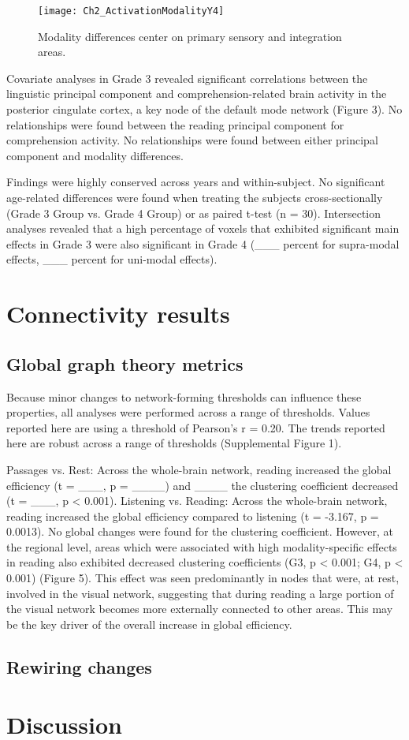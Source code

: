 \begin{figure}[!b]
\centering
\texttt{[image: Ch2\_ActivationModalityY4]}
    \caption[Modality differences center on primary sensory and integration areas.]{Modality differences center on primary sensory and integration areas.}
\label{fig:ch2_modality}
\end{figure}

Covariate analyses in Grade 3 revealed significant correlations between the linguistic principal component and comprehension-related brain activity in the posterior cingulate cortex, a key node of the default mode network (Figure 3). No relationships were found between the reading principal component for comprehension activity. No relationships were found between either principal component and modality differences.

Findings were highly conserved across years and within-subject. No significant age-related differences were found when treating the subjects cross-sectionally (Grade 3 Group vs. Grade 4 Group) or as paired t-test (n = 30). Intersection analyses revealed that a high percentage of voxels that exhibited significant main effects in Grade 3 were also significant in Grade 4 (___ percent for supra-modal effects, ___ percent for uni-modal effects).

\section{Connectivity results}


\subsection{Global graph theory metrics}
Because minor changes to network-forming thresholds can influence these properties, all analyses were performed across a range of thresholds. Values reported here are using a threshold of Pearson’s r = 0.20. The trends reported here are robust across a range of thresholds (Supplemental Figure 1). 

Passages vs. Rest: Across the whole-brain network, reading increased the global efficiency (t = ___, p = ____) and ____ the clustering coefficient decreased (t = ___, p < 0.001).
Listening vs. Reading: Across the whole-brain network, reading increased the global efficiency compared to listening (t = -3.167, p = 0.0013). No global changes were found for the clustering coefficient. However, at the regional level, areas which were associated with high modality-specific effects in reading also exhibited decreased clustering coefficients (G3, p < 0.001; G4, p < 0.001) (Figure 5). This effect was seen predominantly in nodes that were, at rest, involved in the visual network, suggesting that during reading a large portion of the visual network becomes more externally connected to other areas. This may be the key driver of the overall increase in global efficiency.

\subsection{Rewiring changes}



\section{Discussion}